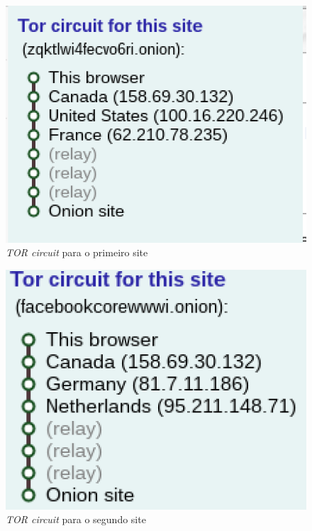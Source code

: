 \documentclass{report}
\begin{document}
\begin{figure}[H]
  \centering
    \includegraphics[width=1\textwidth]{imgs/img1}
  \caption{\textit{TOR circuit} para o primeiro site}
  \label{img1}
\end{figure}

\begin{figure}[H]
  \centering
    \includegraphics[width=1\textwidth]{imgs/img2}
  \caption{\textit{TOR circuit} para o segundo site}
  \label{img2}
\end{figure}
\end{document}
